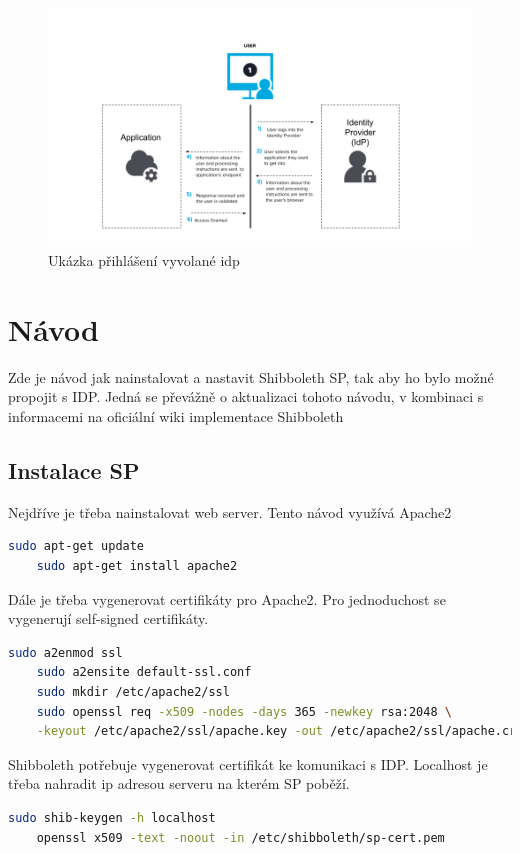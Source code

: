\begin{figure}[bp]
	\centering
    \includegraphics[width=1.2\textwidth]{obrazky-figures/saml-idp.png}
	\caption{Ukázka přihlášení vyvolané idp\cite{SAMLxOIDC}}
	\label{saml-flow}
\end{figure}
\chapter{Návod}
\label{návod}

Zde je návod jak nainstalovat a nastavit Shibboleth SP, tak aby ho bylo možné propojit s IDP. Jedná se převážně o aktualizaci tohoto návodu\cite{shibbolethSpInstallation}, v kombinaci s informacemi na oficiální wiki implementace Shibboleth\cite{shibbolethWikiSP}

\section{Instalace SP}

Nejdříve je třeba nainstalovat web server. Tento návod využívá Apache2
\begin{lstlisting}[language=Bash]
    sudo apt-get update
    sudo apt-get install apache2
\end{lstlisting}

Dále je třeba vygenerovat certifikáty pro Apache2. Pro jednoduchost se vygenerují self-signed certifikáty.
\begin{lstlisting}[language=Bash]
    sudo a2enmod ssl
    sudo a2ensite default-ssl.conf
    sudo mkdir /etc/apache2/ssl
    sudo openssl req -x509 -nodes -days 365 -newkey rsa:2048 \
    -keyout /etc/apache2/ssl/apache.key -out /etc/apache2/ssl/apache.crt
\end{lstlisting}

Shibboleth potřebuje vygenerovat certifikát ke komunikaci s IDP. Localhost je třeba nahradit ip adresou serveru na kterém SP poběží.
\begin{lstlisting}[language=Bash]
    sudo shib-keygen -h localhost
    openssl x509 -text -noout -in /etc/shibboleth/sp-cert.pem
\end{lstlisting}

